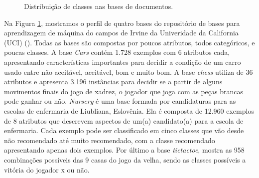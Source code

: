 \begin{figure}[!h]

\caption{Distribuição de classes nas bases de documentos.}
\label{fig::basesdoc}
\end{figure}

Na Figura \ref{fig::basesdoc}, mostramos o perfil de quatro bases do repositório de bases para aprendizagem de máquina do campos de Irvine da Univeridade da California (\textsc{UCI}) (\cite{UCI98}). Todas as bases são compostas por poucos atributos, todos categóricos, e poucas classes. A base \textit{Cars} contém 1.728 exemplos com 6 atributos cada, apresentando características importantes para decidir a condição de um carro usado entre não aceitável, aceitável, bom e muito bom. A base \textit{chess} utiliza de 36 atributos e apresenta 3.196 instâncias para decidir se a partir de alguns movimentos finais do jogo de xadrez, o jogador que joga com as peças brancas pode ganhar ou não. \textit{Nursery} é uma base formada por candidaturas para as escolas de enfermaria de Liubliana, Eslovênia. Ela é composta de 12.960 exemplos de 8 atributos que descrevem aspectos de um(a) candidato(a) para a escola de enfermaria. Cada exemplo pode ser classificado em cinco classes que vão desde não recomendado até muito recomendado, com a classe recomendado apresentando apenas dois exemplos. Por último a base \textit{tictactoe}, mostra as 958 combinações possíveis das 9 casas do jogo da velha, sendo as classes possíveis a vitória do jogador \textsc{x} ou não.

